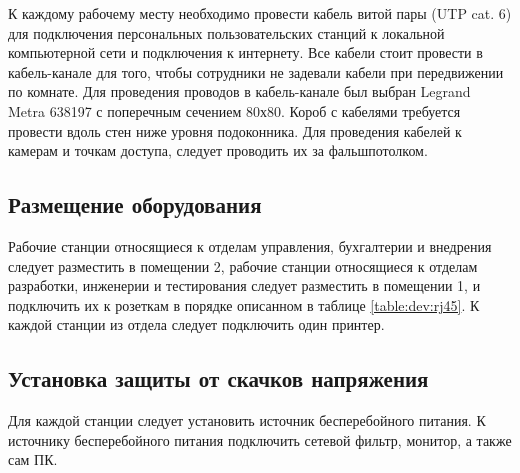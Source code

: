К каждому рабочему месту необходимо провести кабель витой пары (UTP cat. 6) для подключения персональных пользовательских 
станций к локальной компьютерной сети и подключения к интернету. Все кабели стоит провести в кабель-канале для того, чтобы сотрудники 
не задевали кабели при передвижении по комнате. Для проведения проводов в кабель-канале был выбран Legrand
Metra 638197 с поперечным сечением 80х80.
Короб с кабелями требуется провести вдоль стен ниже уровня подоконника.
Для проведения кабелей к камерам и точкам доступа, следует проводить их за фальшпотолком. 

\subsection{Размещение оборудования}

Рабочие станции относящиеся к отделам управления, бухгалтерии и внедрения следует разместить в помещении 2, 
рабочие станции относящиеся к отделам разработки, инженерии и тестирования следует разместить в помещении 1, 
и подключить их к розеткам в порядке описанном в таблице \ref{table:dev:rj45}. К каждой станции из отдела следует 
подключить один принтер.

\subsection{Установка защиты от скачков напряжения}

Для каждой станции следует установить источник бесперебойного питания. К источнику бесперебойного питания подключить сетевой 
фильтр, монитор, а также сам ПК.
